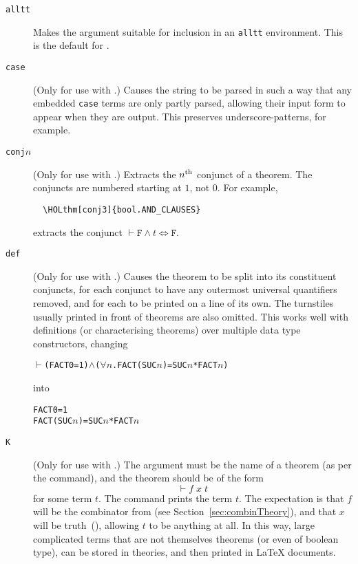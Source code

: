 \begin{description}
\item[\texttt{alltt}] Makes the argument suitable for inclusion in an \texttt{alltt} environment.
%
This is the default for \holthm.
\item[\texttt{case}] (Only for use with \holtm.)
%
Causes the string to be parsed in such a way that any embedded \texttt{case} terms are only partly parsed, allowing their input form to appear when they are output.
%
This preserves underscore-patterns, for example.

\item[\texttt{conj}$n$] (Only for use with \holthm.)
Extracts the $n^{\mbox{\scriptsize th}}$ conjunct of a theorem.
The conjuncts are numbered starting at $1$, not $0$.
For example,
\begin{verbatim}
  \HOLthm[conj3]{bool.AND_CLAUSES}
\end{verbatim}
extracts the conjunct $\vdash \texttt{F} \land t \iff \texttt{F}$.

\item[\texttt{def}] (Only for use with \holthm.)
%
Causes the theorem to be split into its constituent conjuncts, for each conjunct to have any outermost universal quantifiers removed, and for each to be printed on a line of its own.
%
The turnstiles usually printed in front of theorems are also omitted.
%
This works well with definitions (or characterising theorems) over multiple data type constructors, changing
\begin{alltt}
\(\vdash\) (FACT 0 = 1) \(\land\) (\(\forall\)\ensuremath{n}. FACT (SUC \ensuremath{n}) = SUC \ensuremath{n} * FACT \ensuremath{n})
\end{alltt}
into
\begin{alltt}
   FACT 0 = 1
   FACT (SUC \ensuremath{n}) = SUC \ensuremath{n} * FACT \ensuremath{n}
\end{alltt}

\item[\texttt{K}] (Only for use with \holtm.)
%
The argument must be the name of a theorem (as per the \holthm{} command), and the theorem should be of the form
\[
\vdash f\;x\;t
\]
for some term $t$.
%
The command prints the term $t$.
%
The expectation is that $f$ will be the combinator  from  (see Section~\ref{sec:combinTheory}), and that $x$ will be truth~(), allowing $t$ to be anything at all.
%
In this way, large complicated terms that are not themselves theorems (or even of boolean type), can be stored in \HOL{} theories, and then printed in \LaTeX{} documents.


\end{description}
